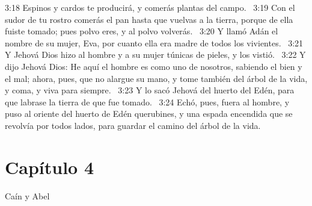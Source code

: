 3:18 Espinos y cardos te producirá, y comerás plantas del campo.  
3:19 Con el sudor de tu rostro comerás el pan hasta que vuelvas a la tierra, porque de ella fuiste tomado; pues polvo eres, y al polvo volverás.  
3:20 Y llamó Adán el nombre de su mujer, Eva, por cuanto ella era madre de todos los vivientes.  
3:21 Y Jehová Dios hizo al hombre y a su mujer túnicas de pieles, y los vistió.  
3:22 Y dijo Jehová Dios: He aquí el hombre es como uno de nosotros, sabiendo el bien y el mal; ahora, pues, que no alargue su mano, y tome también del árbol de la vida, y coma, y viva para siempre.  
3:23 Y lo sacó Jehová del huerto del Edén, para que labrase la tierra de que fue tomado.  
3:24 Echó, pues, fuera al hombre, y puso al oriente del huerto de Edén querubines, y una espada encendida que se revolvía por todos lados, para guardar el camino del árbol de la vida.  
\section*{Capítulo 4}
Caín y Abel  

